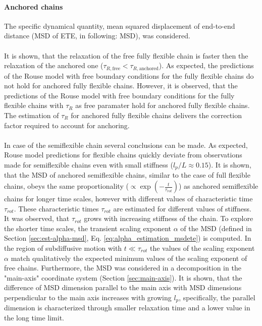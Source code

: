\documentclass[
    paper=A4,pagesize=automedia,fontsize=12pt,
    BCOR=15mm,DIV=22,
    twoside,headinclude,footinclude=false,
    fleqn,             %
    bibliography=totocnumbered,          %
    listof=totoc,                %
    listof=flat,                 %
    cleardoublepage=empty      %
    numbers=endperiod
]{scrartcl}
\begin{document}
\paragraph{Anchored chains}
The specific dynamical quantity, mean squared displacement 
of end-to-end distance (MSD of ETE, in following: MSD), was considered.
\\
\\
It is shown,
that the relaxation of the free fully flexible chain is faster then the relaxation of the
anchored one ($\tau_{R,\text{free}} < \tau_{R,\text{anchored}}$). 
As expected, the predictions of the Rouse model with free boundary conditions 
for the fully flexible chains do not hold for anchored fully flexible chains.
However, it is observed, that the predictions of the Rouse model with free boundary conditions 
for the fully flexible chains with $\tau_R$ as free paramater hold for anchored fully flexible
chains. The estimation of $\tau_R$ for anchored fully flexible chains 
delivers the correction factor required to account for anchoring.
\\
\\
In case of the semiflexible chain several conclusions can be made. As expected,
Rouse model predictions for flexible chains quickly deviate from observations made 
for semiflexible chains even with small stiffness ($l_p/L \approx 0.15$).
It is shown, that the MSD of anchored semiflexible chains, 
similar to the case of full flexible chains, obeys the same 
proportionality ($\propto \exp\left(-\frac{t}{\tau_{rot}}\right)$) 
as anchored semiflexible chains for longer time scales, however with
different values of characteristic time $\tau_{rot}$. These characteristic times 
$\tau_{rot}$ are estimated for different values of stiffness. It was observed, that 
$\tau_{rot}$ grows with increasing stiffness of the chain. 
To explore the shorter time
scales, the transient scaling exponent $\alpha$ of the MSD (defined in 
Section \ref{sec:est-alpha-msd}, Eq. \ref{eq:alpha_estimation_msdete}) is computed.
In the region of subdiffusive 
motion with $t\ll\tau_{rot}$ the values of the scaling exponent $\alpha$ match
qualitatively the expected minimum values of the scaling exponent of free chains.
Furthermore, the MSD was considered in a decomposition in the "main-axis" coordinate 
system (Section \ref{sec:main-axis}). It is shown, that the difference of MSD dimension parallel
to the main axis with MSD dimensions perpendicular to the main axis 
increases with growing $l_p$, specifically, the parallel dimension is 
characterized through smaller relaxation time and a lower value in the long time limit.
\end{document}
